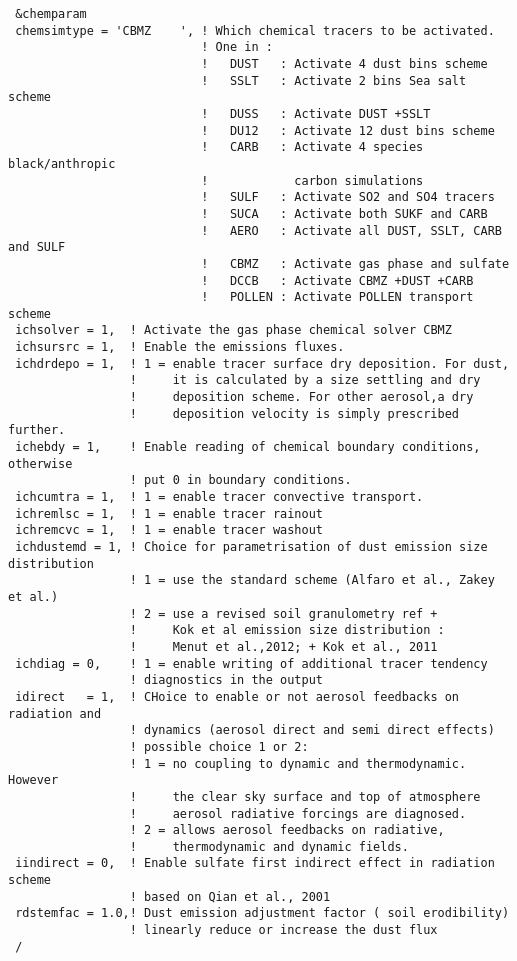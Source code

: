 {\footnotesize
\begin{Verbatim}
 &chemparam
 chemsimtype = 'CBMZ    ', ! Which chemical tracers to be activated.
                           ! One in :
                           !   DUST   : Activate 4 dust bins scheme
                           !   SSLT   : Activate 2 bins Sea salt scheme
                           !   DUSS   : Activate DUST +SSLT
                           !   DU12   : Activate 12 dust bins scheme
                           !   CARB   : Activate 4 species black/anthropic
                           !            carbon simulations
                           !   SULF   : Activate SO2 and SO4 tracers
                           !   SUCA   : Activate both SUKF and CARB
                           !   AERO   : Activate all DUST, SSLT, CARB and SULF
                           !   CBMZ   : Activate gas phase and sulfate
                           !   DCCB   : Activate CBMZ +DUST +CARB
                           !   POLLEN : Activate POLLEN transport scheme
 ichsolver = 1,  ! Activate the gas phase chemical solver CBMZ
 ichsursrc = 1,  ! Enable the emissions fluxes.
 ichdrdepo = 1,  ! 1 = enable tracer surface dry deposition. For dust,
                 !     it is calculated by a size settling and dry
                 !     deposition scheme. For other aerosol,a dry
                 !     deposition velocity is simply prescribed further.
 ichebdy = 1,    ! Enable reading of chemical boundary conditions, otherwise
                 ! put 0 in boundary conditions.
 ichcumtra = 1,  ! 1 = enable tracer convective transport.
 ichremlsc = 1,  ! 1 = enable tracer rainout     
 ichremcvc = 1,  ! 1 = enable tracer washout 
 ichdustemd = 1, ! Choice for parametrisation of dust emission size distribution
                 ! 1 = use the standard scheme (Alfaro et al., Zakey et al.)
                 ! 2 = use a revised soil granulometry ref + 
                 !     Kok et al emission size distribution :
                 !     Menut et al.,2012; + Kok et al., 2011
 ichdiag = 0,    ! 1 = enable writing of additional tracer tendency
                 ! diagnostics in the output
 idirect   = 1,  ! CHoice to enable or not aerosol feedbacks on radiation and
                 ! dynamics (aerosol direct and semi direct effects)
                 ! possible choice 1 or 2:
                 ! 1 = no coupling to dynamic and thermodynamic. However
                 !     the clear sky surface and top of atmosphere 
                 !     aerosol radiative forcings are diagnosed.
                 ! 2 = allows aerosol feedbacks on radiative,
                 !     thermodynamic and dynamic fields.
 iindirect = 0,  ! Enable sulfate first indirect effect in radiation scheme
                 ! based on Qian et al., 2001 
 rdstemfac = 1.0,! Dust emission adjustment factor ( soil erodibility)
                 ! linearly reduce or increase the dust flux
 /
\end{Verbatim}
}

